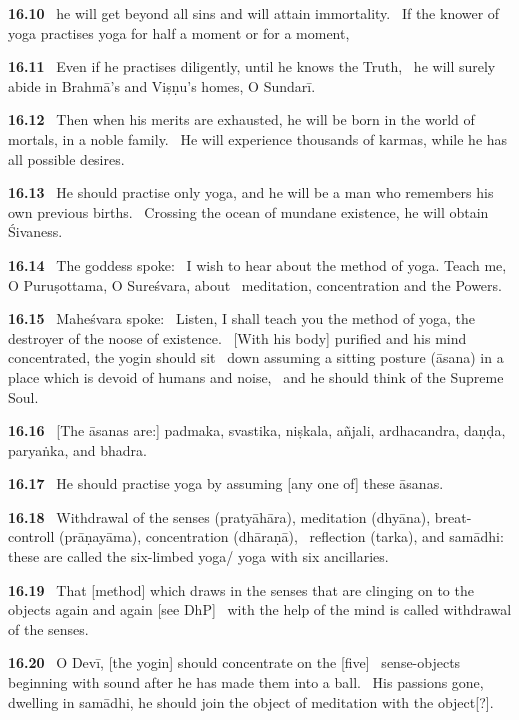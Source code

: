 \documentclass{article}
\begin{document}
\textbf{16.10}%
\ he will get beyond all sins and will attain immortality.%
\                  If the knower of yoga practises yoga for half a moment or for a moment,%


\textbf{16.11}%
\ Even if he practises diligently, until he knows the Truth,%
\                  he will surely abide in Brahmā's and Viṣṇu's homes, O Sundarī.%


\textbf{16.12}%
\ Then when his merits are exhausted, he will be born in the world of mortals, in a noble family.%
\                  He will experience thousands of karmas, while he has all possible desires.%


\textbf{16.13}%
\ He should practise only yoga, and he will be a man who remembers his own previous births.%
\                  Crossing the ocean of mundane existence, he will obtain Śivaness.%


\textbf{16.14}%
\ The goddess spoke:%
\ I wish to hear about the method of yoga. Teach me, O Puruṣottama, O Sureśvara, about%
\ meditation, concentration and the Powers.%


\textbf{16.15}%
\ Maheśvara spoke:%
\ Listen, I shall teach you the method of yoga, the destroyer of the noose of existence.%
\ [With his body] purified and his mind concentrated, the yogin should sit%
\                 down assuming a sitting posture (āsana) in a place which is devoid of humans and noise,%
\ and he should think of the Supreme Soul.%


\textbf{16.16}%
\ [The āsanas are:] padmaka, svastika, niṣkala, añjali, ardhacandra, daṇḍa, paryaṅka, and bhadra.%


\textbf{16.17}%
\ He should practise yoga by assuming [any one of] these āsanas.%


\textbf{16.18}%
\ Withdrawal of the senses (pratyāhāra), meditation (dhyāna), breat-controll (prāṇayāma), concentration (dhāraṇā),%
\ reflection (tarka), and samādhi: these are called the six-limbed yoga/ yoga with six ancillaries.%


\textbf{16.19}%
\ That [method] which draws in the senses that are clinging on to the objects again and again [see DhP]%
\ with the help of the mind is called withdrawal of the senses.%


\textbf{16.20}%
\ O Devī, [the yogin] should concentrate on the [five]%
\                 sense-objects beginning with sound after he has made them into a ball.%
\ His passions gone, dwelling in samādhi, he should join the object of meditation with the object[?].%
\end{document}
